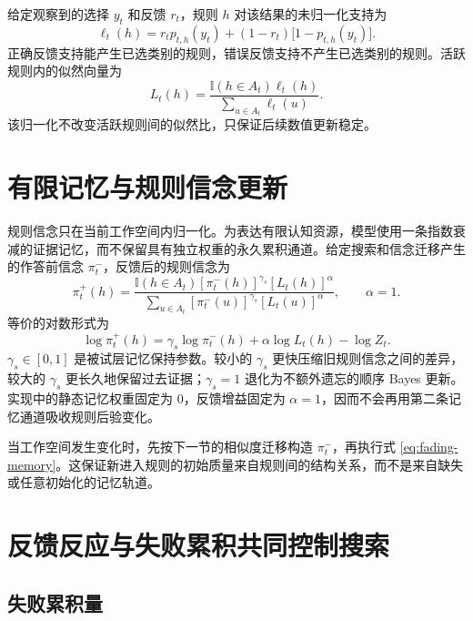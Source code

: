\documentclass[12pt]{article}
\newcommand{\ind}{\mathbb I}
\begin{document}
给定观察到的选择 $y_t$ 和反馈 $r_t$，规则 $h$ 对该结果的未归一化支持为
\begin{equation}
\ell_t(h)
=r_t p_{t,h}(y_t)
+(1-r_t)\bigl[1-p_{t,h}(y_t)\bigr].
\label{eq:feedback-support}
\end{equation}
正确反馈支持能产生已选类别的规则，错误反馈支持不产生已选类别的规则。活跃规则内的似然向量为
\begin{equation}
L_t(h)
=
\frac{\ind(h\in A_t)\ell_t(h)}
{\sum_{u\in A_t}\ell_t(u)}.
\label{eq:normalized-likelihood}
\end{equation}
该归一化不改变活跃规则间的似然比，只保证后续数值更新稳定。


\section{有限记忆与规则信念更新}

规则信念只在当前工作空间内归一化。为表达有限认知资源，模型使用一条指数衰减的证据记忆，而不保留具有独立权重的永久累积通道。给定搜索和信念迁移产生的作答前信念 $\pi_t^{-}$，反馈后的规则信念为
\begin{equation}
\pi_t^{+}(h)
=
\frac{
\ind(h\in A_t)
[\pi_t^{-}(h)]^{\gamma_s}
[L_t(h)]^{\alpha}
}{
\sum_{u\in A_t}
[\pi_t^{-}(u)]^{\gamma_s}
[L_t(u)]^{\alpha}
},
\qquad
\alpha=1.
\label{eq:fading-memory}
\end{equation}
等价的对数形式为
\begin{equation}
\log\pi_t^{+}(h)
=\gamma_s\log\pi_t^{-}(h)+\alpha\log L_t(h)-\log Z_t.
\label{eq:fading-memory-log}
\end{equation}
$\gamma_s\in[0,1]$ 是被试层记忆保持参数。较小的 $\gamma_s$ 更快压缩旧规则信念之间的差异，较大的 $\gamma_s$ 更长久地保留过去证据；$\gamma_s=1$ 退化为不额外遗忘的顺序 Bayes 更新。实现中的静态记忆权重固定为 0，反馈增益固定为 $\alpha=1$，因而不会再用第二条记忆通道吸收规则后验变化。

当工作空间发生变化时，先按下一节的相似度迁移构造 $\pi_t^{-}$，再执行式 \eqref{eq:fading-memory}。这保证新进入规则的初始质量来自规则间的结构关系，而不是来自缺失或任意初始化的记忆轨道。


\section{反馈反应与失败累积共同控制搜索}

\subsection{失败累积量}
\end{document}
